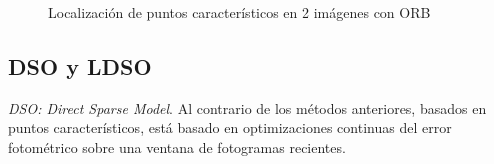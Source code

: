 \begin{figure}[H]
\begin{center}
\hspace{0.5cm}
\end{center}
\caption{Localización de puntos característicos en 2 imágenes con ORB }
\end{figure}

\clearpage

\subsection{DSO y LDSO}
\textit{DSO: Direct Sparse Model}.
Al contrario de los métodos anteriores, basados en puntos característicos, está basado en optimizaciones continuas del error fotométrico sobre una ventana de fotogramas recientes\cite{Engel2016direct}.


